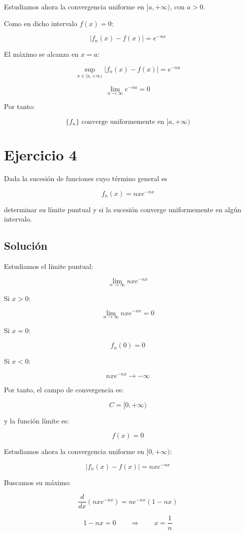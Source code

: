 \documentclass[fleqn]{article}
\begin{document}
	Estudiamos ahora la convergencia uniforme en $[a,+\infty)$, con $a>0$.

	Como en dicho intervalo $f(x)=0$:

	\[
	|f_n(x)-f(x)|
	=
	e^{-nx}
	\]

	El máximo se alcanza en $x=a$:

	\[
	\sup_{x\in[a,+\infty)}
	|f_n(x)-f(x)|
	=
	e^{-na}
	\]

	\[
	\lim_{n\to\infty}e^{-na}=0
	\]

	Por tanto:

	\[
	\boxed{
	\{f_n\}\text{ converge uniformemente en }[a,+\infty)
	}
	\]

\section{Ejercicio 4}
	Dada la sucesión de funciones cuyo término general es

	\[
	f_n(x)=nxe^{-nx}
	\]

	determinar su límite puntual y si la sucesión converge uniformemente en algún intervalo.

	\subsection{Solución}

	Estudiamos el límite puntual:

	\[
	\lim_{n\to\infty}nxe^{-nx}
	\]

	Si $x>0$:

	\[
	\lim_{n\to\infty}nxe^{-nx}=0
	\]

	Si $x=0$:

	\[
	f_n(0)=0
	\]

	Si $x<0$:

	\[
	nxe^{-nx}\to-\infty
	\]

	Por tanto, el campo de convergencia es:

	\[
	\boxed{
	C=[0,+\infty)
	}
	\]

	y la función límite es:

	\[
	f(x)=0
	\]

	Estudiamos ahora la convergencia uniforme en $[0,+\infty)$:

	\[
	|f_n(x)-f(x)|
	=
	nxe^{-nx}
	\]

	Buscamos su máximo:

	\[
	\frac{d}{dx}
	\left(
	nxe^{-nx}
	\right)
	=
	ne^{-nx}(1-nx)
	\]

	\[
	1-nx=0
	\qquad\Longrightarrow\qquad
	x=\frac{1}{n}
	\]
\end{document}
